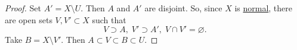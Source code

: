 \documentclass{article}
\renewcommand{\emptyset}{\varnothing}
\begin{document}
\begin{proof}
    Set $A' = X\setminus U$. Then $A$ and $A'$ are disjoint. So, since $X$ is \hyperlink{def:normal}{normal}, there are open sets $V, V' \subset X$ such that
    \begin{equation*}
        V \supset A, \; V' \supset A', \; V \cap V' = \emptyset.
    \end{equation*}
    Take $B = X \setminus V'$. Then $A \subset V \subset B \subset U$.
\end{proof}

\end{document}
